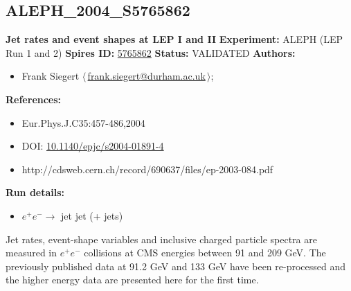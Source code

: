 \subsection[ALEPH\_2004\_S5765862]{ALEPH\_2004\_S5765862\,\cite{Heister:2003aj}}
\textbf{Jet rates and event shapes at LEP I and II}\newline
\textbf{Experiment:} ALEPH (LEP Run 1 and 2) \newline
\textbf{Spires ID:} \href{http://www.slac.stanford.edu/spires/find/hep/www?rawcmd=key+5765862}{5765862}\newline
\textbf{Status:} VALIDATED\newline
\textbf{Authors:}
\begin{itemize}
  \item Frank Siegert $\langle\,$\href{mailto:frank.siegert@durham.ac.uk}{frank.siegert@durham.ac.uk}$\,\rangle$;
\end{itemize}
\textbf{References:}
\begin{itemize}
  \item Eur.Phys.J.C35:457-486,2004
  \item DOI: \href{http://dx.doi.org/10.1140/epjc/s2004-01891-4}{10.1140/epjc/s2004-01891-4}
  \item http://cdsweb.cern.ch/record/690637/files/ep-2003-084.pdf
\end{itemize}
\textbf{Run details:}
\begin{itemize}

  \item $e^+ e^- \to$ jet jet (+ jets)\end{itemize}

\noindent Jet rates, event-shape variables and inclusive charged particle spectra are measured in $e^+ e^-$ collisions at CMS energies between 91 and 209 GeV. The previously published data at 91.2 GeV and 133 GeV have been re-processed and the higher energy data are presented here for the first time.

\clearpage


\clearpage

